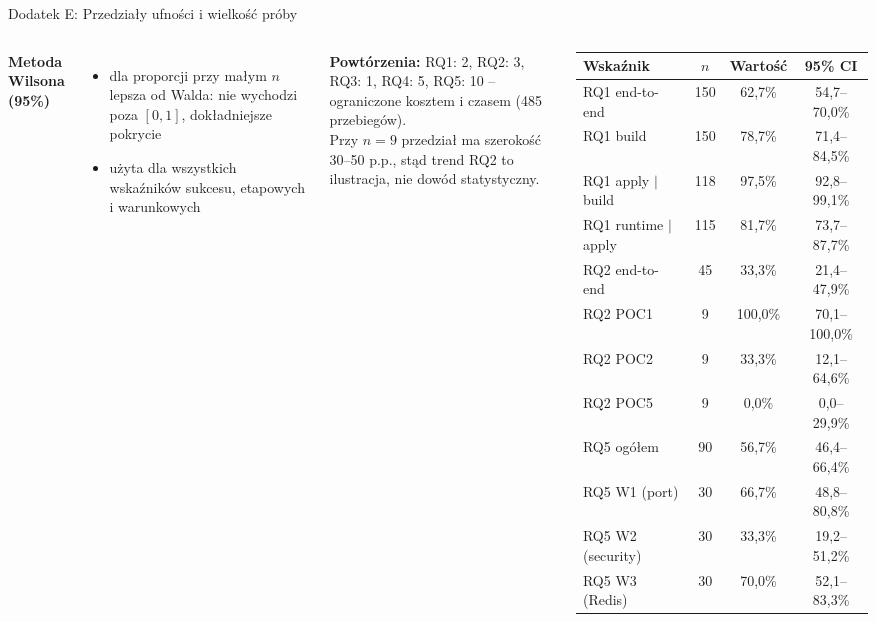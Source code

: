 \documentclass[aspectratio=169]{beamer}
\begin{document}
\begin{frame}{Dodatek E: Przedziały ufności i wielkość próby}
    \begin{columns}[T]
        \textbf{Metoda Wilsona (95\%)}
        {\footnotesize
        \begin{itemize}
            \item dla proporcji przy małym $n$ lepsza od Walda: nie wychodzi poza $[0,1]$, dokładniejsze pokrycie
            \item użyta dla wszystkich wskaźników sukcesu, etapowych i warunkowych
        \end{itemize}
        \vspace{0.4em}
        \textbf{Powtórzenia:} RQ1: 2, RQ2: 3, RQ3: 1, RQ4: 5, RQ5: 10 -- ograniczone kosztem i czasem (485 przebiegów).\\[0.4em]
        Przy $n=9$ przedział ma szerokość 30--50 p.p., stąd trend RQ2 to ilustracja, nie dowód statystyczny.}
        {\footnotesize
        \begin{tabular}{@{}lccc@{}}
            \toprule
            \textbf{Wskaźnik} & $n$ & \textbf{Wartość} & \textbf{95\% CI} \\
            \midrule
            RQ1 end-to-end & 150 & 62,7\% & 54,7--70,0\% \\
            RQ1 build & 150 & 78,7\% & 71,4--84,5\% \\
            RQ1 apply $|$ build & 118 & 97,5\% & 92,8--99,1\% \\
            RQ1 runtime $|$ apply & 115 & 81,7\% & 73,7--87,7\% \\
            \midrule
            RQ2 end-to-end & 45 & 33,3\% & 21,4--47,9\% \\
            RQ2 POC1 & 9 & 100,0\% & 70,1--100,0\% \\
            RQ2 POC2 & 9 & 33,3\% & 12,1--64,6\% \\
            RQ2 POC5 & 9 & 0,0\% & 0,0--29,9\% \\
            \midrule
            RQ5 ogółem & 90 & 56,7\% & 46,4--66,4\% \\
            RQ5 W1 (port) & 30 & 66,7\% & 48,8--80,8\% \\
            RQ5 W2 (security) & 30 & 33,3\% & 19,2--51,2\% \\
            RQ5 W3 (Redis) & 30 & 70,0\% & 52,1--83,3\% \\
            \bottomrule
        \end{tabular}}
    \end{columns}
\end{frame}
\end{document}
